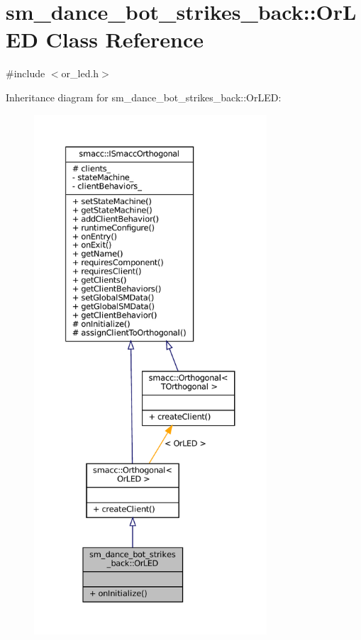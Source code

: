 \hypertarget{classsm__dance__bot__strikes__back_1_1OrLED}{}\section{sm\+\_\+dance\+\_\+bot\+\_\+strikes\+\_\+back\+:\+:Or\+L\+ED Class Reference}
\label{classsm__dance__bot__strikes__back_1_1OrLED}


{\ttfamily \#include $<$or\+\_\+led.\+h$>$}



Inheritance diagram for sm\+\_\+dance\+\_\+bot\+\_\+strikes\+\_\+back\+:\+:Or\+L\+ED\+:
\nopagebreak
\begin{figure}[H]
\begin{center}
\leavevmode
\includegraphics[height=550pt]{classsm__dance__bot__strikes__back_1_1OrLED__inherit__graph}
\end{center}
\end{figure}


